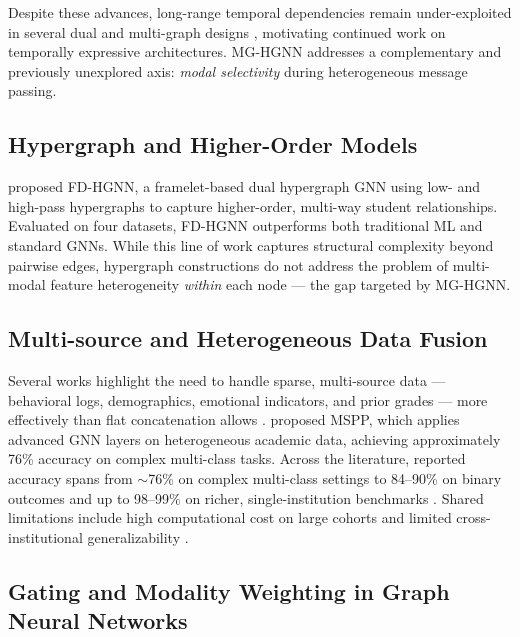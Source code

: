 \documentclass[sigconf]{acmart}
\begin{document}
Despite these advances, long-range temporal dependencies remain
under-exploited in several dual and multi-graph designs
\citep{huang2024dual, huang2024temporal, balachandar2024mspp}, motivating
continued work on temporally expressive architectures. MG-HGNN addresses
a complementary and previously unexplored axis: \emph{modal selectivity}
during heterogeneous message passing.

\subsection{Hypergraph and Higher-Order Models}

\citet{yang2024hypergraph} proposed FD-HGNN, a framelet-based dual
hypergraph GNN using low- and high-pass hypergraphs to capture higher-order,
multi-way student relationships. Evaluated on four datasets, FD-HGNN
outperforms both traditional ML and standard GNNs. While this line of work
captures structural complexity beyond pairwise edges, hypergraph
constructions do not address the problem of multi-modal feature
heterogeneity \emph{within} each node --- the gap targeted by MG-HGNN.

\subsection{Multi-source and Heterogeneous Data Fusion}

Several works highlight the need to handle sparse, multi-source data ---
behavioral logs, demographics, emotional indicators, and prior grades ---
more effectively than flat concatenation allows
\citep{huang2024dual, zhang2025gnttinet, huang2024temporal,
li2022studygnn, yang2024hypergraph, balachandar2024mspp}.
\citet{balachandar2024mspp} proposed MSPP, which applies advanced GNN
layers on heterogeneous academic data, achieving approximately 76\%
accuracy on complex multi-class tasks. Across the literature, reported
accuracy spans from $\sim$76\% on complex multi-class settings
\citep{balachandar2024mspp} to 84--90\% on binary outcomes
\citep{huang2024dual} and up to 98--99\% on richer, single-institution
benchmarks \citep{zhang2025gnttinet}. Shared limitations include high
computational cost on large cohorts and limited cross-institutional
generalizability \citep{huang2024dual, li2022studygnn, zhang2025gnttinet,
huang2024temporal, yang2024hypergraph, balachandar2024mspp}.

\subsection{Gating and Modality Weighting in Graph Neural Networks}
\end{document}
